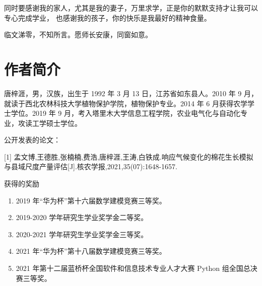 \documentclass[a4paper,oneside,zihao=5,AutoFakeBold,fontset=windows]{ctexbook}
\begin{document}
\begin{spacing}{}
  同时要感谢我的家人，尤其是我的妻子，万里求学，正是你的默默支持才让我可以专心完成学业，%
  也感谢我的孩子，你的快乐是我最好的精神食量。%

  临文涕零，不知所言。愿师长安康，同窗如意。

  \chapter*{作者简介}
  唐梓涯，男，汉族，出生于 1992 年 3 月 13 日，江苏省如东县人。2010 年 9 月，就读于西北农林科技大学植物保护学院，植物保护专业。2014 年 6 月获得农学学士学位。2019 年 9 月，考入塔里木大学信息工程学院，农业电气化与自动化专业，攻读工学硕士学位。

  公开发表的论文：

  [1] 孟文博,王德胜,张楠楠,费浩,唐梓涯,王涛,白铁成.响应气候变化的棉花生长模拟与县域尺度产量评估[J].核农学报,2021,35(07):1648-1657.

  获得的奖励
  \begin{enumerate}
    \item 2019 年“华为杯”第十六届数学建模竞赛三等奖。
    \item 2019{-}2020 学年研究生学业奖学金二等奖。
    \item 2020{-}2021 学年研究生学业奖学金三等奖。
    \item 2021 年“华为杯”第十八届数学建模竞赛三等奖。
    \item 2021 年第十二届蓝桥杯全国软件和信息技术专业人才大赛 Python 组全国总决赛三等奖。
  \end{enumerate}
\end{spacing}
\end{document}
